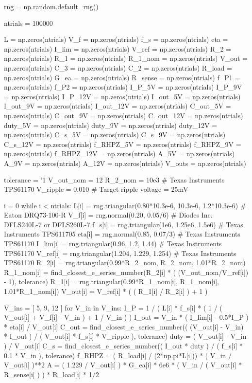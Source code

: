 \documentclass[12pt, titlepage]{tex-template}
\begin{document}
\begin{pycode}
rng = np.random.default_rng()

ntrials = 100000

L = np.zeros(ntrials)
V_f = np.zeros(ntrials)
f_s = np.zeros(ntrials)
eta = np.zeros(ntrials)
I_lim = np.zeros(ntrials)
V_ref = np.zeros(ntrials)
R_2 = np.zeros(ntrials)
R_1 = np.zeros(ntrials)
R_1_nom = np.zeros(ntrials)
V_out = np.zeros(ntrials)
C_3 = np.zeros(ntrials)
C_2 = np.zeros(ntrials)
R_load = np.zeros(ntrials)
G_ea = np.zeros(ntrials)
R_sense = np.zeros(ntrials)
f_P1 = np.zeros(ntrials)
f_P2 = np.zeros(ntrials)
I_P_5V = np.zeros(ntrials)
I_P_9V = np.zeros(ntrials)
I_P_12V = np.zeros(ntrials)
I_out_5V = np.zeros(ntrials)
I_out_9V = np.zeros(ntrials)
I_out_12V = np.zeros(ntrials)
C_out_5V = np.zeros(ntrials)
C_out_9V = np.zeros(ntrials)
C_out_12V = np.zeros(ntrials)
duty_5V = np.zeros(ntrials)
duty_9V = np.zeros(ntrials)
duty_12V = np.zeros(ntrials)
C_s_5V = np.zeros(ntrials)
C_s_9V = np.zeros(ntrials)
C_s_12V = np.zeros(ntrials)
f_RHPZ_5V = np.zeros(ntrials)
f_RHPZ_9V = np.zeros(ntrials)
f_RHPZ_12V = np.zeros(ntrials)
A_5V = np.zeros(ntrials)
A_9V = np.zeros(ntrials)
A_12V = np.zeros(ntrials)
V_outs = np.zeros(ntrials)

tolerance = '1%
V_out_nom = 12
R_2_nom = 10e3 # Texas Instruments TPS61170
V_ripple = 0.010 # Target ripple voltage = 25mV

i = 0
while i < ntrials:
    L[i] = rng.triangular(0.80*10.3e-6, 10.3e-6, 1.2*10.3e-6) # Eaton DRQ73-100-R
    V_f[i] = rng.normal(0.20, 0.05/6) # Diodes Inc. DFLS240L-7 or DFLS260L-7
    f_s[i] = rng.triangular(1e6, 1.25e6, 1.5e6) # Texas Instruments TPS611705
    eta[i] = rng.normal(0.85, 0.07/3) # Texas Instruments TPS61170
    I_lim[i] = rng.triangular(0.96, 1.2, 1.44) # Texas Instruments TPS61170
    V_ref[i] = rng.triangular(1.204, 1.229, 1.254) # Texas Instruments TPS61170
    R_2[i] = rng.triangular(0.99*R_2_nom, R_2_nom, 1.01*R_2_nom)
    R_1_nom[i] = find_closest_e_series_number(R_2[i] * ( (V_out_nom/V_ref[i]) - 1), tolerance)
    R_1[i] = rng.triangular(0.99*R_1_nom[i], R_1_nom[i], 1.01*R_1_nom[i])
    V_out[i] = V_ref[i] * ( ( R_1[i] / R_2[i] ) + 1 )

    V_ins = [ 5, 9, 12 ]
    for V_in in V_ins:
        I_P = 1 / ( L[i] * f_s[i] * ( 1 / ( V_out[i] + V_f[i] - V_in ) + 1 / V_in ) )
        I_out = V_in * ( I_lim[i] - 0.5*I_P ) * eta[i] / V_out[i]
        C_out = find_closest_e_series_number(( (V_out[i] - V_in) * I_out ) / ( V_out[i] * f_s[i] * V_ripple ), tolerance)
        duty = ( V_out[i] - V_in ) / V_out[i]
        C_s = find_closest_e_series_number(( I_out * duty ) / ( f_s[i] * 0.1 * V_in ), tolerance)
        f_RHPZ = ( R_load[i] / (2*np.pi*L[i])) * ( V_in / V_out[i] )**2
        A = ( 1.229 / V_out[i] ) * G_ea[i] * 6e6 * ( V_in / ( V_out[i] * R_sense[i] ) ) * R_load[i] * 1/2


\end{pycode}
\end{document}
